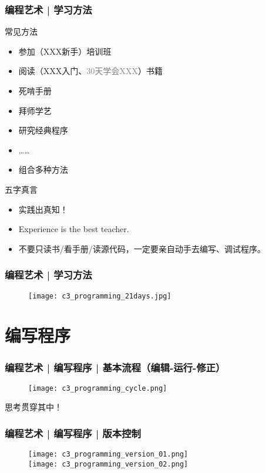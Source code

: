 \begin{frame}
  \frametitle{编程艺术 | 学习方法}
  \begin{block}{常见方法}
    \begin{itemize}
      \item 参加（XXX新手）培训班
      \item 阅读（XXX入门、\textcolor{gray}{30天学会XXX}）书籍
      \item 死啃手册
      \item 拜师学艺
      \item 研究经典程序
      \item ……
      \item 组合多种方法
    \end{itemize}
  \end{block}
  \pause
  \begin{block}{\alert{五字真言}}
    \begin{itemize}
      \item 实践出真知！
      \item Experience is the best teacher.
      \item 不要只读书/看手册/读源代码，一定要亲自动手去编写、调试程序。
    \end{itemize}
  \end{block}
\end{frame}

\begin{frame}
  \frametitle{编程艺术 | 学习方法}
  \begin{figure}
    \centering
    \texttt{[image: c3\_programming\_21days.jpg]}
  \end{figure}
\end{frame}

\section{编写程序}
\begin{frame}
  \frametitle{编程艺术 | 编写程序 | \alert{基本流程（编辑-运行-修正）}}
  \begin{figure}
    \centering
    \texttt{[image: c3\_programming\_cycle.png]}
  \end{figure}
  \pause
  \begin{center}
    \alert{思考}贯穿其中！
  \end{center}
\end{frame}

\begin{frame}
  \frametitle{编程艺术 | 编写程序 | 版本控制}
  \begin{figure}
    \centering
    \texttt{[image: c3\_programming\_version\_01.png]}\\
    \texttt{[image: c3\_programming\_version\_02.png]}\\
  \end{figure}
\end{frame}


